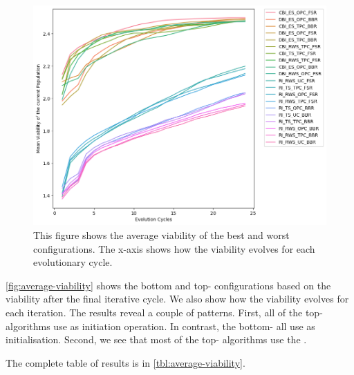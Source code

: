 \documentclass[./../../paper.tex]{subfiles}
\begin{document}
\begin{figure}[htbp]
    \centering
    \includegraphics[width=\textwidth]{figures/generated/exp1_effect_on_viability_top10_last10.png}
    \caption{This figure shows the average viability of the  best and worst configurations. The x-axis shows how the viability evolves for each evolutionary cycle.}
    \label{fig:average-viability}
\end{figure}

\noindent \autoref{fig:average-viability} shows the bottom and top- configurations based on the viability after the final iterative cycle. We also show how the viability evolves for each iteration. The results reveal a couple of patterns. 
First, all of the top- algorithms use  as initiation operation. In contrast, the bottom- all use  as initialisation. 
Second, we see that most of the top- algorithms use the . 

The complete table of results is in \autoref{tbl:average-viability}.

\end{document}

